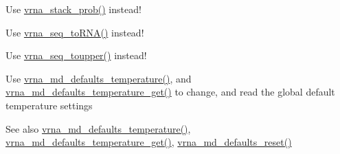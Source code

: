 \begin{DoxyRefList}
\item[\label{deprecated__deprecated000102}%
\hypertarget{deprecated__deprecated000102}{}%
Global \hyperlink{part__func_8h_ae856dd7a8d75c471c07153882bf1db48}{stack\+Prob} (double cutoff)]Use \hyperlink{group__pf__fold_ga26e3cc2eb127a35625572e9275c24ee4}{vrna\+\_\+stack\+\_\+prob()} instead!  
\item[\label{deprecated__deprecated000125}%
\hypertarget{deprecated__deprecated000125}{}%
Global \hyperlink{string__utils_8h_ad3f18dd83f958f18b2f26ecb99305208}{str\+\_\+\+D\+N\+A2\+R\+N\+A} (char $\ast$sequence)]Use \hyperlink{group__string__utils_gacfed92cba77064f6c743f9118d079bfc}{vrna\+\_\+seq\+\_\+to\+R\+N\+A()} instead!  
\item[\label{deprecated__deprecated000124}%
\hypertarget{deprecated__deprecated000124}{}%
Global \hyperlink{string__utils_8h_a17b796b806f96b70382077fb5bc519bb}{str\+\_\+uppercase} (char $\ast$sequence)]Use \hyperlink{group__string__utils_ga4f44dca03c9d708d68e64c0610bb9091}{vrna\+\_\+seq\+\_\+toupper()} instead!  
\item[\label{deprecated__deprecated000081}%
\hypertarget{deprecated__deprecated000081}{}%
Global \hyperlink{group__model__details_gab4b11c8d9c758430960896bc3fe82ead}{temperature} ]Use \hyperlink{group__model__details_gaf9e527e9a2f7e6fd6e42bc6e602f5445}{vrna\+\_\+md\+\_\+defaults\+\_\+temperature()}, and \hyperlink{group__model__details_ga96b24a74437f9ba46c4e06343155bf46}{vrna\+\_\+md\+\_\+defaults\+\_\+temperature\+\_\+get()} to change, and read the global default temperature settings \begin{DoxySeeAlso}{See also}
\hyperlink{group__model__details_gaf9e527e9a2f7e6fd6e42bc6e602f5445}{vrna\+\_\+md\+\_\+defaults\+\_\+temperature()}, \hyperlink{group__model__details_ga96b24a74437f9ba46c4e06343155bf46}{vrna\+\_\+md\+\_\+defaults\+\_\+temperature\+\_\+get()}, \hyperlink{group__model__details_ga70834424cf804d149937de89f80ceb45}{vrna\+\_\+md\+\_\+defaults\+\_\+reset()}  
\end{DoxySeeAlso}


\end{DoxyRefList}
